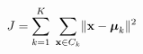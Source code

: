 \documentclass[preview]{standalone}
\begin{document}
\begin{align*}
\special{dvisvgm:raw <g id='unique000'>}J = \sum_{k=1}^{K}\;\sum_{\mathbf{x}\in C_k} \special{dvisvgm:raw </g>}\special{dvisvgm:raw <g id='unique001'>}\lVert \mathbf{x} - \boldsymbol{\mu}_k \rVert^{2}\special{dvisvgm:raw </g>}
\end{align*}
\end{document}
